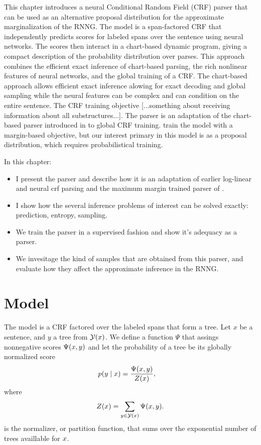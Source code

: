 % 

This chapter introduces a neural Conditional Random Field (CRF) parser that can be used as an alternative proposal distribution for the approximate marginalization of the RNNG. The model is a span-factored CRF that independently predicts scores for labeled spans over the sentence using neural networks. The scores then interact in a chart-based dynamic program, giving a compact description of the probability distribution over parses. This approach combines the efficient exact inference of chart-based parsing, the rich nonlinear features of neural networks, and the global training of a CRF. The chart-based approach allows efficient exact inference alowing for exact decoding and global sampling while the neural features can be complex and can condition on the entire sentence. The CRF training objective [...something about receiving information about all substructures...]. The parser is an adaptation of the chart-based parser introduced in \citet{stern2017minimal} to global CRF training. \citet{stern2017minimal} train the model with a margin-based objective, but our interest primary in this model is as a proposal distribution, which requires probabilistical training.

In this chapter:
\begin{itemize}
  \item I present the parser and describe how it is an adaptation of earlier log-linear and neural crf parsing \citep{finkel2008crf,klein2015crf} and the maximum margin trained parser of \citet{stern2017minimal}.
  \item I show how the several inference problems of interest can be solved exactly: prediction, entropy, sampling.
  \item We train the parser in a supervised fashion and show it's adequacy as a parser.
  \item We invesitage the kind of samples that are obtained from this parser, and evaluate how they affect the approximate inference in the RNNG.
\end{itemize}


\section{Model}
The model is a CRF factored over the labeled spans that form a tree. Let $x$ be a sentence, and $y$ a tree from $\mathcal{Y}(x)$. We define a function $\Psi$ that assings nonnegative scores $\Psi(x, y)$ and let the probability of a tree be its globally normalized score
\begin{align}
  \label{eq:crf-model}
  p(y \mid x) &= \frac{\Psi(x, y)}{Z(x)},
\end{align}
where
\begin{align*}
  Z(x) = \sum_{ y \in \mathcal{Y}(x) } \Psi(x, y).
\end{align*}
is the normalizer, or partition function, that sums over the exponential number of trees availlable for $x$.

